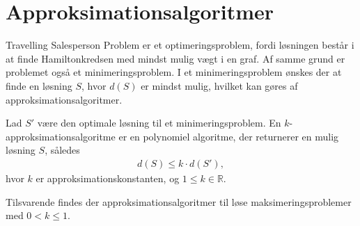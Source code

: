 \section{Approksimationsalgoritmer}
Travelling Salesperson Problem er et optimeringsproblem, fordi løsningen består i at finde Hamiltonkredsen med mindst mulig vægt i en graf. 
Af samme grund er problemet også et minimeringsproblem. 
I et minimeringsproblem ønskes der at finde en løsning $S$, hvor $d(S)$ er mindst mulig, hvilket kan gøres af approksimationsalgoritmer.

\begin{defn}\label{def:apk}
Lad $S'$ være den optimale løsning til et minimeringsproblem. En $k$-approksimationsalgoritme er en polynomiel algoritme, der returnerer en mulig løsning $S$, således
\begin{align*}
d(S) \leq k \cdot d(S'),
\end{align*}
hvor $k$ er approksimationskonstanten, og $1 \leq k \in \mathbb{R}$.
\end{defn}

Tilsvarende findes der approksimationsalgoritmer til løse maksimeringsproblemer med $0 < k \leq 1$.